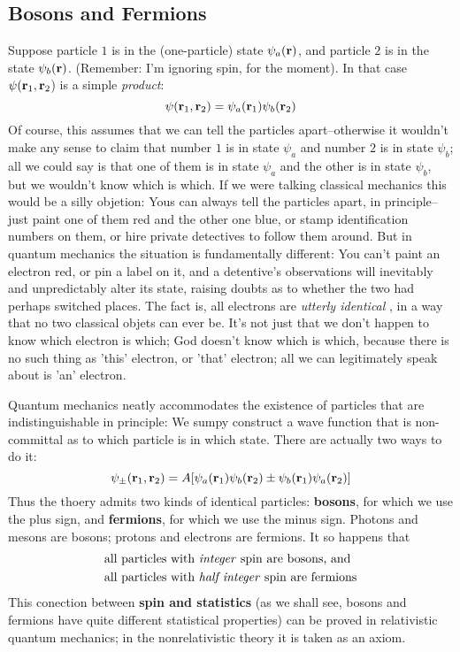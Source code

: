 \subsection{Bosons and Fermions}
Suppose particle $1$ is in the (one-particle) state $\psi_a(\vb{r})$, and particle $2$ is in the state $\psi_b(\vb{r})$. (Remember: I'm ignoring spin, for the moment). In that case $\psi(\vb{r}_1,\vb{r}_2$) is a simple \textit{product}:
\begin{equation}\label{5.9}
	\psi(\vb{r}_1,\vb{r}_2)=\psi_a(\vb{r}_1)\psi_b(\vb{r}_2)
\end{equation}
Of course, this assumes that we can tell the particles apart--otherwise it wouldn't make any sense to claim that number $1$ is in state $\psi_a$ and number $2$ is in state $\psi_b$; all we could say is that one of them is in state $\psi_a$ and the other is in state $\psi_b$, but we wouldn't know which is which. If we were talking classical mechanics this would be a silly objetion: Yous can always tell the particles apart, in principle--just paint one of them red and the other one blue, or stamp identification numbers on them, or hire private detectives to follow them around. But in quantum mechanics the situation is fundamentally different: You can't paint an electron red, or pin a label on it, and a detentive's observations will inevitably and unpredictably alter its state, raising doubts as to whether the two had perhaps switched places. The fact is, all electrons are \textit{utterly identical} , in a way that no two classical objets can ever be. It's not just that we don't happen to know which electron is which; God doesn't know which is which, because there is no such thing as 'this' electron, or 'that' electron; all we can legitimately speak about is 'an' electron.

Quantum mechanics neatly accommodates the existence of particles that are indistinguishable in principle: We sumpy construct a wave function that is non-committal as to which particle is in which state. There are actually two ways to do it:
\begin{equation}\label{5.10}
	\psi_{\pm}(\vb{r}_1,\vb{r}_2)=A[\psi_a(\vb{r}_1)\psi_b(\vb{r}_2)\pm \psi_b(\vb{r}_1)\psi_a(\vb{r}_2)]
\end{equation}
Thus the thoery admits two kinds of identical particles: \textbf{bosons}, for which we use the plus sign, and \textbf{fermions}, for which we use the minus sign. Photons and mesons are bosons; protons and electrons are fermions. It so happens that
\begin{align}
	\nonumber &\mbox{all particles with \textit{integer} spin are bosons, and } \\
						&\mbox{all particles with \textit{half integer} spin are fermions}\label{5.11}
\end{align}
This conection between \textbf{spin and statistics} (as we shall see, bosons and fermions have quite different statistical properties) can be proved in relativistic quantum mechanics; in the nonrelativistic theory it is taken as an axiom.

